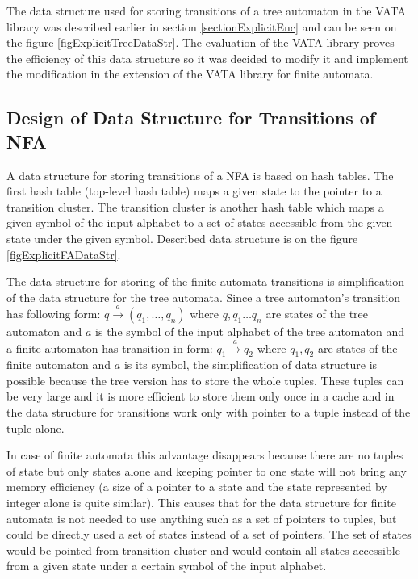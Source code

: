 The data structure used for storing transitions of a tree automaton in the VATA library was described earlier in section \ref{sectionExplicitEnc} and can be seen
on the figure \ref{figExplicitTreeDataStr}. The evaluation of the VATA library \cite{libvata} proves the efficiency of this data structure so it was
decided to modify it and implement the modification in the extension of the VATA library for finite automata.

\subsection{Design of Data Structure for Transitions of NFA}
A data structure for storing transitions of a NFA is based on hash tables. The first hash table (top-level hash table) maps a given state to the pointer to
a transition cluster. The transition cluster is another hash table which maps a given symbol of the input alphabet to a set of states accessible from
the given state under the given symbol. 
Described data structure is on the figure \ref{figExplicitFADataStr}.

The data structure for storing of the finite automata transitions is simplification of the data structure for the tree automata. Since a tree automaton's
transition has following form: $q \xrightarrow{a} (q_1,\ldots,q_n)$ where $q,q_1\ldots q_n$ are states of the tree automaton and $a$ is the symbol of 
the input alphabet of the tree automaton and a finite automaton has transition in form: $q_1 \xrightarrow{a} q_2$ 
where $q_1,q_2$ are states of the finite automaton and $a$ is its symbol, the simplification of data structure is possible because 
the tree version has to store the whole tuples. These tuples can be very large and it is more efficient to store them only once in a cache and 
in the data structure for transitions work only with pointer to a tuple instead of the tuple alone. 

In case of finite automata this advantage disappears because there are no tuples of state but only states alone and keeping pointer to one state will not 
bring any memory efficiency (a size of a pointer to a state and the state represented by integer alone is quite similar). This causes that for the data structure 
for finite automata is not needed to use anything such as a set of pointers to tuples, but could be directly used a set of states instead of
a set of pointers. The set of states would be pointed from transition cluster and would contain all states accessible from a given state under a 
certain symbol of the input alphabet.

